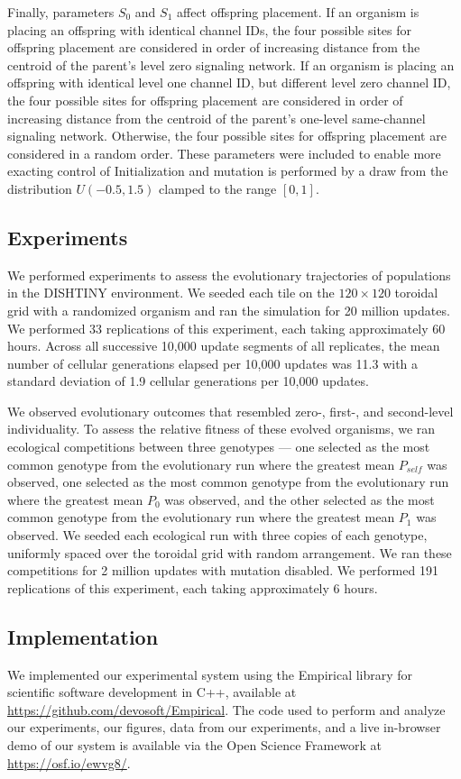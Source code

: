 Finally, parameters $S_0$ and $S_1$ affect offspring placement.
If an organism is placing an offspring with identical channel IDs, the four possible sites for offspring placement are considered in order of increasing distance from the centroid of the parent's level zero signaling network.
If an organism is placing an offspring with identical level one channel ID, but different level zero channel ID, the four possible sites for offspring placement are considered in order of increasing distance from the centroid of the parent's one-level same-channel signaling network.
Otherwise, the four possible sites for offspring placement are considered in a random order.
These parameters were included to enable more exacting control of
Initialization and mutation is performed by a draw from the distribution $U(-0.5,1.5)$ clamped to the range $[0,1]$.

\subsection{Experiments}

We performed experiments to assess the evolutionary trajectories of populations %
in the DISHTINY environment.
We seeded each tile on the $120 \times 120$ toroidal grid with a randomized organism and ran the simulation for 20 million updates.
We performed 33 replications of this experiment, each taking approximately 60 hours.
Across all successive 10,000 update segments of all replicates, the mean number of cellular generations elapsed per 10,000 updates was 11.3 with a standard deviation of 1.9 cellular generations per 10,000 updates.

We observed evolutionary outcomes that resembled zero-, first-, and second-level individuality.
To assess the relative fitness of these evolved organisms, we ran ecological competitions between three genotypes --- one selected as the most common genotype from the evolutionary run where the greatest mean $P_{self}$ was observed, one selected as the most common genotype from the evolutionary run where the greatest mean $P_0$ was observed, and the other selected as the most common genotype from the evolutionary run where the greatest mean $P_1$ was observed.
We seeded each ecological run with three copies of each genotype, uniformly spaced over the toroidal grid with random arrangement. We ran these competitions for 2 million updates with mutation disabled.
We performed 191 replications of this experiment, each taking approximately 6 hours.


\subsection{Implementation}


We implemented our experimental system using the Empirical library for scientific software development in C++, available at \url{https://github.com/devosoft/Empirical}.  The code used to perform and analyze our experiments, our figures, data from our experiments, and a live in-browser demo of our system is available via the Open Science Framework at \url{https://osf.io/ewvg8/}.

